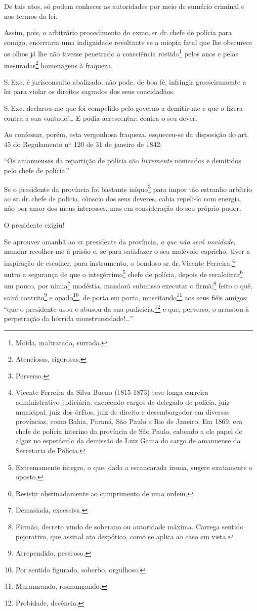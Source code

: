 De tais atos, só podem conhecer as autoridades por meio de sumário
criminal e nos termos da lei.

Assim, pois, o arbitrário procedimento do exmo.\,sr.\,dr.\,chefe de polícia
para comigo, encerraria uma indignidade revoltante se a miopia fatal que
lhe obscurece os olhos já lhe não tivesse penetrado a consciência
rostida\footnote{Moída, maltratada, surrada.} pelos anos e pelas
mesuradas\footnote{Atenciosas, rigorosas.} homenagens à fraqueza.

S.\,Exc. é jurisconsulto abalizado; não pode, de boa fé, infringir
grosseiramente a lei para violar os direitos sagrados dos seus
concidadãos.

S.\,Exc. declarou-me que foi compelido pelo governo a demitir-me e que o
fizera contra a sua vontade!\ldots{} E podia acrescentar: contra o seu dever.

Ao confessar, porém, esta vergonhosa fraqueza, esqueceu-se da disposição
do art. 45 do Regulamento nº 120 de 31 de janeiro de 1842:

``Os amanuenses da repartição de polícia são \emph{livremente} nomeados e
demitidos pelo chefe de polícia.''

Se o presidente da província foi bastante iníquo\footnote{Perverso.}
para impor tão estranho arbítrio ao sr.\,dr.\,chefe de polícia, cônscio
dos seus deveres, cabia repeli-lo com energia, não por amor dos meus
interesses, mas em consideração do seu próprio pudor.

O presidente exigiu!

Se aprouver amanhã ao sr.\,presidente da província, \emph{o que não será
novidade}, mandar recolher-me à prisão e, se para satisfazer o seu
malévolo capricho, tiver a inspiração de escolher, para instrumento, o
bondoso sr.\,dr.\,Vicente Ferreira,\footnote{Vicente Ferreira da Silva
  Bueno (1815-1873) teve longa carreira administrativo-judiciária,
  exercendo cargos de delegado de polícia, juiz municipal, juiz dos
  órfãos, juiz de direito e desembargador em diversas províncias, como
  Bahia, Paraná, São Paulo e Rio de Janeiro. Em 1869, era chefe de
  polícia interino da província de São Paulo, cabendo a ele papel de
  algoz no espetáculo da demissão de Luiz Gama do cargo de amanuense da
  Secretaria de Polícia.} nutro a segurança de que o
integérrimo\footnote{Extremamente íntegro, o que, dada a escancarada
  ironia, sugere exatamente o oposto.} chefe de polícia, depois de
recalcitrar\footnote{Resistir obstinadamente ao cumprimento de uma
  ordem.} um pouco, por nímia\footnote{Demasiada, excessiva.}
modéstia, mandará submisso executar o firmã;\footnote{Firmão, decreto
  vindo de soberano ou autoridade máxima. Carrega sentido pejorativo,
  que assinal ato despótico, como se aplica ao caso em vista.} feito o
quê, sairá contrito\footnote{Arrependido, pesaroso.} e
opado\footnote{Por sentido figurado, soberbo, orgulhoso.}, de porta em
porta, mussitando\footnote{Murmurando, resmungando.} aos seus fiéis
amigos: ``que o presidente usou e abusou da sua pudicícia;\footnote{
  Probidade, decência.} e que, perverso, o arrastou à perpetração da
hórrida monstruosidade!\ldots{}''

